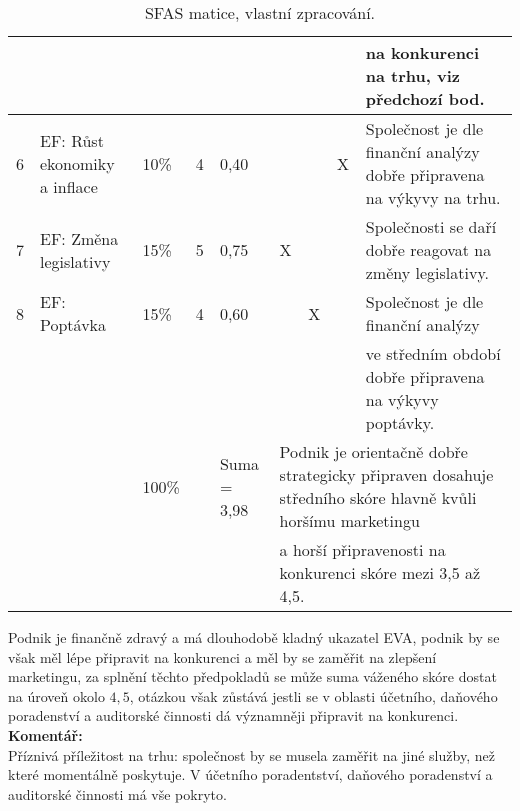\begin{table}[!hbtp]
{{\begin{tabular}{|l|l|l|l|l|llll|}
 &  &  &  &  & \multicolumn{1}{l|}{} & \multicolumn{1}{l|}{} & \multicolumn{1}{l|}{} & na konkurenci na trhu, viz předchozí bod. \\ \hline
6 & EF: Růst ekonomiky a inflace & 10\% & 4 & 0,40 & \multicolumn{1}{l|}{} & \multicolumn{1}{l|}{} & \multicolumn{1}{l|}{X} & Společnost je dle finanční analýzy dobře připravena na výkyvy na trhu. \\ \hline
7 & EF: Změna legislativy & 15\% & 5 & 0,75 & \multicolumn{1}{l|}{X} & \multicolumn{1}{l|}{} & \multicolumn{1}{l|}{} & Společnosti se daří dobře reagovat na změny legislativy. \\ \hline
8 & EF: Poptávka & 15\% & 4 & 0,60 & \multicolumn{1}{l|}{} & \multicolumn{1}{l|}{X} & \multicolumn{1}{l|}{} & Společnost je dle finanční analýzy \\
 &  &  &  &  & \multicolumn{1}{l|}{} & \multicolumn{1}{l|}{} & \multicolumn{1}{l|}{} & ve středním období dobře připravena na výkyvy poptávky. \\ \hline
\cellcolor[HTML]{C0C0C0} & \cellcolor[HTML]{C0C0C0} & 100\% & \cellcolor[HTML]{C0C0C0} & Suma = 3,98 & \multicolumn{4}{l|}{Podnik je orientačně dobře strategicky připraven dosahuje středního skóre hlavně kvůli horšímu marketingu} \\
\cellcolor[HTML]{C0C0C0} & \cellcolor[HTML]{C0C0C0} &  & \cellcolor[HTML]{C0C0C0} &  & \multicolumn{4}{l|}{a horší připravenosti na konkurenci skóre mezi 3,5 až 4,5.} \\ \hline
\end{tabular}
}
}
\caption[SFAS matice]{SFAS matice, vlastní zpracování.}
\label{tab:SFAS matice}
\end{table}

Podnik je finančně zdravý a má dlouhodobě kladný ukazatel EVA, podnik by se však měl lépe připravit na konkurenci a měl by se zaměřit na zlepšení marketingu, za splnění těchto předpokladů se může suma váženého skóre dostat na úroveň okolo $4,5$, otázkou však zůstává jestli se v oblasti účetního, daňového poradenství a auditorské činnosti dá významněji připravit na konkurenci.\\

\noindent\textbf{Komentář:}\\

Příznivá příležitost na trhu: společnost by se musela zaměřit na jiné služby, než které momentálně poskytuje. V účetního poradentství, daňového poradenství a auditorské činnosti má vše pokryto.\\


